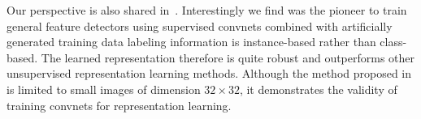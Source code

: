 \documentclass[preprint,12pt]{elsarticle}
\begin{document}
Our perspective is also shared in~\cite{DBLP:conf/nips/DosovitskiySRB14,DBLP:journals/corr/Valpola14,DBLP:journals/corr/RasmusVHBR15}. Interestingly we find \cite{DBLP:conf/nips/DosovitskiySRB14}  was the pioneer to train general feature detectors using supervised convnets combined with artificially generated training data labeling information is instance-based rather than class-based. The learned representation therefore is quite robust and outperforms other unsupervised representation learning methods. Although the method proposed in \cite{DBLP:conf/nips/DosovitskiySRB14} is limited to small images of dimension $32\times 32$, it demonstrates the validity of training convnets for representation learning.


\end{document}
